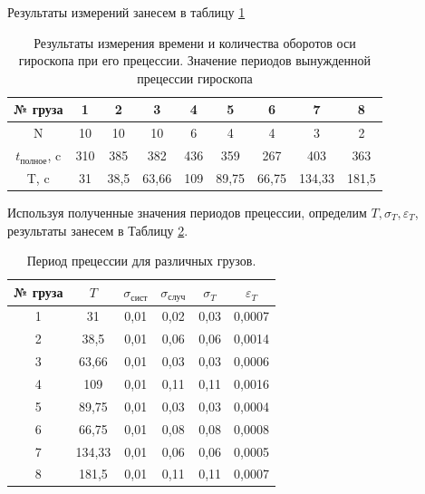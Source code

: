\documentclass[12pt,a4paper]{article}
\begin{document}
Результаты измерений занесем в таблицу \ref{tab:time_and_count_of_rev}

\begin{table}[h]
	\begin{center}
		\begin{tabular}{|c|c|c|c|c|c|c|c|c|}
			\hline		                                                      
			№ груза & 1      & 2      & 3      & 4      & 5      & 6      & 7      & 8      \\ \hline
			N    & 10      & 10      & 10      & 6      & 4      & 4      & 3      & 2      \\ \hline
			$t_{\text{полное}}$, c    & 310 & 385 & 382 & 436 & 359  & 267 & 403 & 363 \\ \hline
			T, c & 31 & 38,5 & 63,66 & 109 & 89,75 & 66,75 & 134,33 & 181,5 \\ \hline
		\end{tabular}
		\caption{Результаты измерения времени и количества оборотов оси гироскопа при его прецессии. Значение периодов вынужденной прецессии гироскопа}
		\label{tab:time_and_count_of_rev}
	\end{center}
\end{table}



Используя полученные значения периодов прецессии, определим $T, \sigma_{T}, \varepsilon_{T}$, результаты занесем в Таблицу \ref{tab:periods_and_sigma}.

\begin{table}[h]
	\begin{center}
		\begin{tabular}{|c|c|c|c|c|c|}
			\hline
			№ груза & $T$ & $\sigma_{\text{сист}}$ & $\sigma_{\text{случ}}$ & $\sigma_{T}$ & $\varepsilon_{T}$ \\ \hline
			1       & 31  & 0,01       & 0,02       & 0,03  & 0,0007  \\ \hline
			2       & 38,5  & 0,01       & 0,06       & 0,06  & 0,0014  \\ \hline
			3       & 63,66  & 0,01       & 0,03       & 0,03  & 0,0006  \\ \hline
			4       & 109  & 0,01       & 0,11       & 0,11  & 0,0016  \\ \hline
			5       & 89,75  & 0,01       & 0,03       & 0,03  & 0,0004  \\ \hline
			6       & 66,75 & 0,01       & 0,08       & 0,08  & 0,0008  \\ \hline
			7       & 134,33 & 0,01       & 0,06       & 0,06  & 0,0005  \\ \hline
			8       & 181,5 & 0,01       & 0,11       & 0,11  & 0,0007  \\ \hline
		\end{tabular}
		\caption{Период прецессии для различных грузов.}
		\label{tab:periods_and_sigma}
	\end{center}
\end{table}
\end{document}
